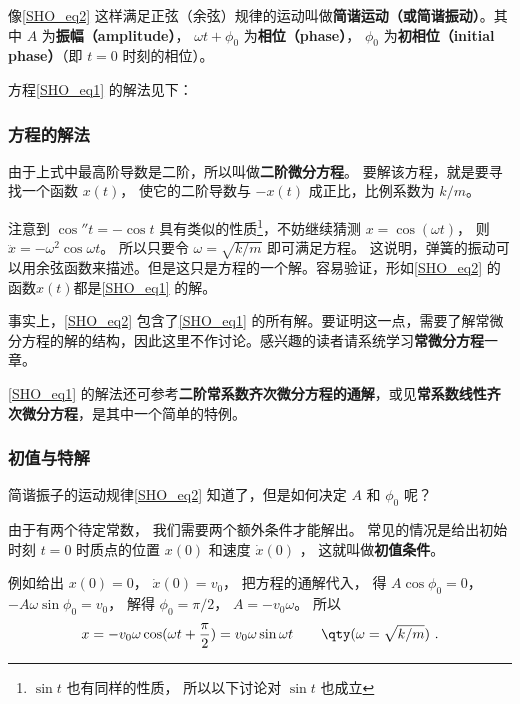 像\autoref{SHO_eq2} 这样满足正弦（余弦）规律的运动叫做\textbf{简谐运动（或简谐振动）}。其中 $A$ 为\textbf{振幅（amplitude）}， $\omega t + \phi_0$ 为\textbf{相位（phase）}， $\phi_0$ 为\textbf{初相位（initial phase）}（即 $t = 0$ 时刻的相位）。 


方程\autoref{SHO_eq1} 的解法见下：



\subsubsection{方程的解法}

由于上式中最高阶导数是二阶，所以叫做\textbf{二阶微分方程}。 要解该方程，就是要寻找一个函数 $x(t)$， 使它的二阶导数与 $- x(t)$ 成正比，比例系数为 $k/m$。 

注意到 $\cos'' t =  - \cos t$ 具有类似的性质\footnote{$\sin t$ 也有同样的性质， 所以以下讨论对 $\sin t$ 也成立}，不妨继续猜测 $x = \cos(\omega t)$， 则 $\ddot x =  - {\omega ^2}\cos \omega t$。 所以只要令 $\omega = \sqrt{k/m}$ 即可满足方程。 这说明，弹簧的振动可以用余弦函数来描述。但是这只是方程的一个解。容易验证，形如\autoref{SHO_eq2} 的函数$x(t)$都是\autoref{SHO_eq1} 的解。

事实上，\autoref{SHO_eq2}  包含了\autoref{SHO_eq1}  的所有解。要证明这一点，需要了解常微分方程的解的结构，因此这里不作讨论。感兴趣的读者请系统学习\textbf{常微分方程}一章。

\autoref{SHO_eq1} 的解法还可参考\textbf{二阶常系数齐次微分方程的通解}，或见\textbf{常系数线性齐次微分方程}，是其中一个简单的特例。


\subsubsection{初值与特解}


简谐振子的运动规律\autoref{SHO_eq2} 知道了，但是如何决定 $A$ 和 $\phi_0$ 呢？ 

由于有两个待定常数， 我们需要两个额外条件才能解出。 常见的情况是给出初始时刻 $t = 0$ 时质点的位置 $x(0)$ 和速度 $\dot x(0)$ ， 这就叫做\textbf{初值条件}。

例如给出 $x(0) = 0$，  $\dot x(0) = v_0$， 把方程的通解代入， 得 $A\cos \phi_0 = 0$，  $ - A\omega \sin \phi_0 = v_0$， 解得 $\phi_0 = \pi /2$，  $A =  -v_0\omega $。 所以
\begin{equation}
x =  - v_0\omega \cos (\omega t + \frac{\pi }{2}) = v_0\omega \sin \omega t \qquad \qty(\omega  = \sqrt{k/m})~.
\end{equation}

